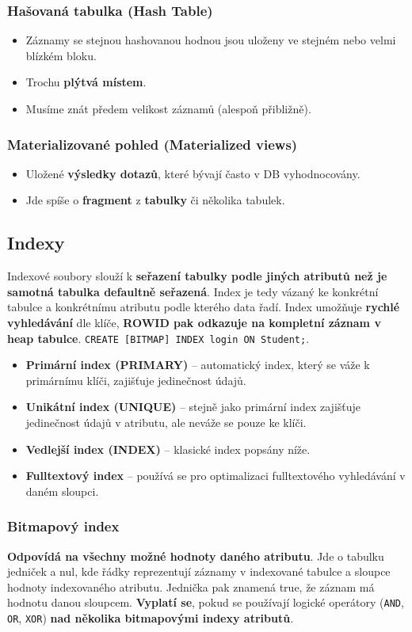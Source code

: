 \subsubsection{Hašovaná tabulka (Hash Table)}
\begin{itemize}
\item Záznamy se stejnou hashovanou hodnou jsou uloženy ve stejném nebo velmi blízkém bloku.
\item Trochu \textbf{plýtvá místem}.
\item Musíme znát předem velikost záznamů (alespoň přibližně).
\end{itemize}

\subsubsection{Materializované pohled (Materialized views)}
\begin{itemize}
\item Uložené \textbf{výsledky dotazů}, které bývají často v DB vyhodnocovány.
\item Jde spíše o \textbf{fragment} z \textbf{tabulky} či několika tabulek.
\end{itemize}

\subsection{Indexy}
Indexové soubory slouží k \textbf{seřazení tabulky podle jiných atributů než je samotná tabulka defaultně seřazená}. Index je tedy vázaný ke konkrétní tabulce a konkrétnímu atributu podle kterého data řadí. Index umožňuje \textbf{rychlé vyhledávání} dle klíče, \textbf{ROWID pak odkazuje na kompletní záznam v heap tabulce}. \texttt{CREATE [BITMAP] INDEX login ON Student;}. 
\begin{itemize}
\item \textbf{Primární index (PRIMARY)} -- automatický index, který se váže k primárnímu klíči, zajišťuje jedinečnost údajů.
\item \textbf{Unikátní index (UNIQUE)} -- stejně jako primární index zajišťuje jedinečnost údajů v atributu, ale neváže se pouze ke klíči.
\item \textbf{Vedlejší index (INDEX)} -- klasické index popsány níže.
\item \textbf{Fulltextový index} -- používá se pro optimalizaci fulltextového vyhledávání v daném sloupci.
\end{itemize}

\subsubsection{Bitmapový index}
\textbf{Odpovídá na všechny možné hodnoty daného atributu}. Jde o tabulku jedniček a nul, kde řádky reprezentují záznamy v indexované tabulce a sloupce hodnoty indexovaného atributu. Jednička pak znamená true, že záznam má hodnotu danou sloupcem. \textbf{Vyplatí se}, pokud se používají logické operátory (\texttt{AND}, \texttt{OR}, \texttt{XOR}) \textbf{nad několika bitmapovými indexy atributů}.

